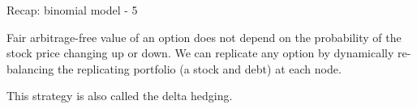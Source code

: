 \documentclass{beamer}
\begin{document}
\begin{frame}{Recap: binomial model - 5}
\centering
{}

\justify
Fair arbitrage-free value of an option does not depend on the probability of the stock price changing up or down. We can replicate any option by \alert{dynamically} re-balancing the replicating portfolio (a stock and debt) at each node.

\justify
This strategy is also called the \alert{delta hedging}.
\end{frame}



\newcommand{\highlightStockLink}[6]{
	\draw[
		color=#4,
		very thick,
		->,
		>=triangle 45
	]
	(#1.east) -- (#2.west)
	node[
		pos=#5,
		anchor=#6
	]
	{#3};
}

\newcommand{\highlightStockLinkUp}[3]{
	\highlightStockLink{#1}{#2}{$q$}{#3}{0.5}{south}
}
\end{document}
